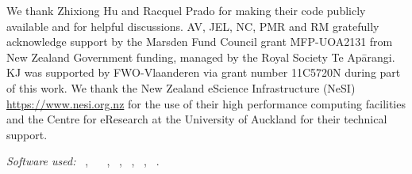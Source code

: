 \documentclass[%
 reprint,
 amsmath,amssymb,
 aps,
 nofootinbib,
]{revtex4-2}
\begin{document}
\begin{acknowledgments}
We thank Zhixiong Hu and Racquel Prado for making their code publicly available and for helpful discussions. AV,  JEL, NC, PMR and RM gratefully acknowledge support  by the Marsden Fund Council grant MFP-UOA2131 from New Zealand Government funding, managed by the Royal Society Te Apārangi. KJ was supported by FWO-Vlaanderen via grant number 11C5720N during part of this work.
We thank the New Zealand eScience Infrastructure
(NeSI) \url{https://www.nesi.org.nz} for the use of their high performance computing facilities and the Centre for eResearch at the University of Auckland for their technical
support.
\end{acknowledgments}


\vspace{4mm}
\noindent\textit{Software used:}
\python~\cite{python2020},
\tensorflowProb~\cite{tensorflow, tensorflowProb}
\numpy~\cite{numpy},
\scipy~\cite{scipy},
\pandas~\cite{pandas},
\matplotlib~\cite{matplotlib},
\jupyterbook~\cite{jupyterbook}.




\end{document}
